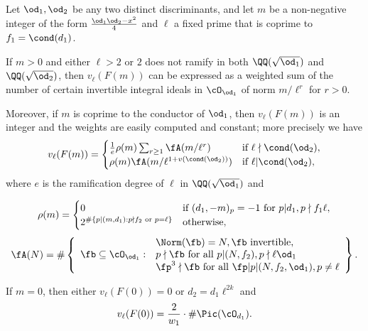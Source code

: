 \documentclass[11pt, proquest]{uwthesis}
\begin{document}
\begin{theorem}\label{Thm:LVMain}
  Let $\od_1,\od_2$ be any two distinct discriminants, and let $m$ be a non-negative integer of the form $\frac{\od_1\od_2 - x^2}{4}$ and $\ell$ a fixed prime that is coprime to $f_1 = \cond(d_1)$.

  If $m> 0$ and either $\ell > 2$ or $2$ does not ramify in both $\QQ(\sqrt{\od_1})$ and $\QQ(\sqrt{\od_2})$, then $v_\ell(F(m))$ can be expressed as a weighted sum of the number of certain invertible integral ideals in $\cO_{\od_1}$ of norm $m/\ell^r$ for $r >0$.

  Moreover, if $m$ is coprime to the conductor of $\od_1$, then $v_{\ell}(F(m))$ is an integer and the weights are easily computed and constant; more precisely we have
  \begin{equation}\label{eqn:vlf}
    v_{\ell}(F(m)) =
    \begin{cases}
      \frac{1}{e}\rho(m)\sum_{r\ge1}\fA(m/\ell^r) &
      \textup{if }\ell\nmid \cond(\od_2),           \\
      \rho(m)\fA(m/\ell^{1 + v(\cond(\od_2))})    &
      \textup{if }\ell| \cond(\od_2),               \\
    \end{cases}
  \end{equation}
  where $e$ is the ramification degree of $\ell$ in $\QQ(\sqrt{\od_1})$ and

  \[\rho(m) =
    \begin{cases}
      0                        & \textup{if } (d_1, -m)_p = -1 \textup{ for }p|d_1, p \nmid f_1\ell, \\
      2^{\#\{p|(m, d_1) : p\nmid f_2
      \textup{ or } p= \ell\}} & \textup{otherwise},
    \end{cases}
  \]
  \begin{equation}\label{A(N):Eq}
    \fA(N) =  \#\left\{
    \begin{array}{ll}
                                & \Norm(\fb) = N, \fb \textup{ invertible}, \\
      \fb\subseteq\cO_{\od_1} : & p\nmid\fb
      \textup{ for all }p | (N, f_2), p\nmid \ell \od_1                     \\
                                & \fp^3\nmid\fb\textup{ for all }
      \fp|p|(N, f_2, \od_1), p\ne\ell
    \end{array}
    \right\}.
  \end{equation}

  If $m = 0$, then either $v_{\ell}(F(0)) = 0$ or $d_2 = d_1\ell^{2k}$ and
  \[
    v_{\ell}(F(0)) = \frac{2}{w_1}\cdot\#\Pic(\cO_{d_1}).
  \]
\end{theorem}
\end{document}
